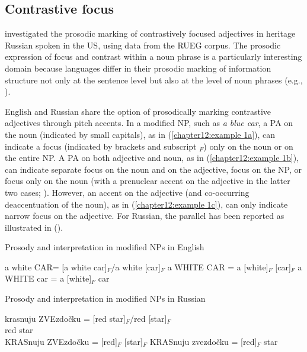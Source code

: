 \documentclass[output=paper,colorlinks,citecolor=brown]{langscibook}
\begin{document}
\subsection{Contrastive focus} \label{chapter12:section 4.2}

\citet{Zerbian_Böttcher_Zuban_2022} investigated the prosodic marking of contrastively focused adjectives in heritage Russian spoken in the US, using data from the RUEG corpus. The prosodic expression of focus and contrast within a noun phrase is a particularly interesting domain because languages differ in their prosodic marking of information structure not only at the sentence level but also at the level of noun phrases (e.g., \cite{Ladd_2008}).

English and Russian share the option of prosodically marking contrastive adjectives through pitch accents. In a modified NP, such as \textit{a blue car}, a PA on the noun (indicated by small capitals), as in (\ref{chapter12:example 1a}), can indicate a focus (indicated by brackets and subscript $_F$) only on the noun or on the entire NP. A PA on both adjective and noun, as in (\ref{chapter12:example 1b}), can indicate separate focus on the noun and on the adjective, focus on the NP, or focus only on the noun (with a prenuclear accent on the adjective in the latter two cases; \cite[8]{Ladd_2008}). However, an accent on the adjective (and co-occurring deaccentuation of the noun), as in (\ref{chapter12:example 1c}), can only indicate narrow focus on the adjective. For Russian, the parallel has been reported as illustrated in  (\cites[57]{King_1993}[4--5]{Jasinskaja_2016}).

\begin{exe}
    \ex Prosody and interpretation in modified NPs in English
    \label{chapter12:example 1}
        \begin{xlist}
            \ex a white \textsc{CAR}= [a white car]$_F$\slash a white [car]$_F$
            \label{chapter12:example 1a}
            \ex a \textsc{WHITE CAR} = a [white]$_F$ [car]$_F$
            \label{chapter12:example 1b}
            \ex a \textsc{WHITE} car   = a [white]$_F$ car
            \label{chapter12:example 1c}
        \end{xlist}
    \ex Prosody and interpretation in modified NPs in Russian
    \label{chapter12:example 2}
        \begin{xlist}
            \ex 
            \gll krasnuju \textsc{ZVE}zdočku = [red star]$_F$\slash red [star]$_F$ \\
                red star\\
            \ex \textsc{KRAS}nuju \textsc{ZVE}zdočku =  [red]$_F$ [star]$_F$
            \ex \textsc{KRAS}nuju zvezdočku  = [red]$_F$ star
        \end{xlist}
\end{exe}
        
\end{document}
